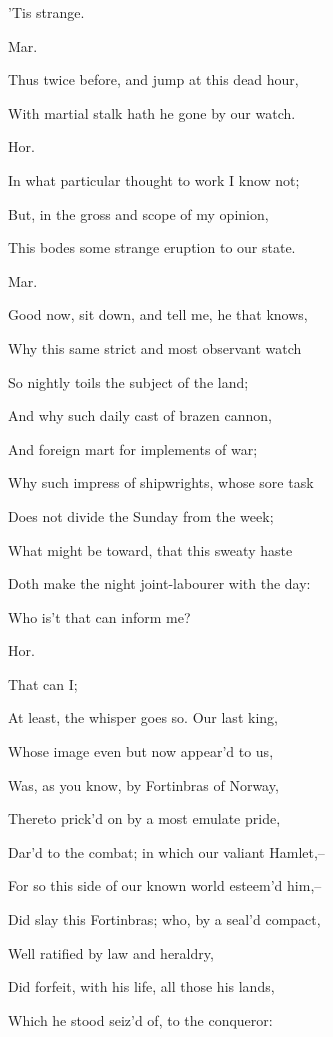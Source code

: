 \documentclass[12pt]{book}
\begin{document}
'Tis strange.



Mar.

Thus twice before, and jump at this dead hour,

With martial stalk hath he gone by our watch.



Hor.

In what particular thought to work I know not;

But, in the gross and scope of my opinion,

This bodes some strange eruption to our state.



Mar.

Good now, sit down, and tell me, he that knows,

Why this same strict and most observant watch

So nightly toils the subject of the land;

And why such daily cast of brazen cannon,

And foreign mart for implements of war;

Why such impress of shipwrights, whose sore task

Does not divide the Sunday from the week;

What might be toward, that this sweaty haste

Doth make the night joint-labourer with the day:

Who is't that can inform me?



Hor.

That can I;

At least, the whisper goes so. Our last king,

Whose image even but now appear'd to us,

Was, as you know, by Fortinbras of Norway,

Thereto prick'd on by a most emulate pride,

Dar'd to the combat; in which our valiant Hamlet,--

For so this side of our known world esteem'd him,--

Did slay this Fortinbras; who, by a seal'd compact,

Well ratified by law and heraldry,

Did forfeit, with his life, all those his lands,

Which he stood seiz'd of, to the conqueror:
\end{document}

